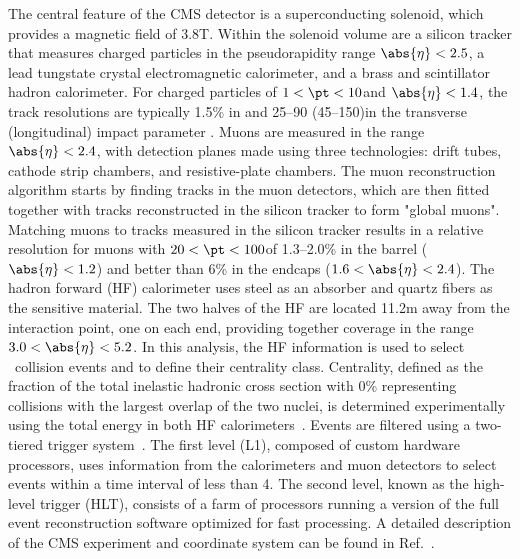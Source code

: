 The central feature of the CMS detector is a superconducting solenoid, which provides a magnetic field of 3.8\unit{T}. Within the solenoid volume are a silicon tracker that measures charged particles in the pseudorapidity range $\abs{\eta} < 2.5$, a lead tungstate crystal electromagnetic calorimeter, and a brass and scintillator hadron calorimeter. For charged particles of $1 < \pt < 10$\GeVc and $\abs{\eta} < 1.4$, the track resolutions are typically 1.5\% in \pt and 25--90 (45--150)\mum in the transverse (longitudinal) impact parameter \cite{TRK-11-001}. Muons are measured in the range $\abs{\eta} < 2.4$, with detection planes made using three technologies: drift tubes, cathode strip chambers, and resistive-plate chambers. The muon reconstruction algorithm starts by finding tracks in the muon detectors, which are then fitted together with tracks reconstructed in the silicon tracker to form "global muons". Matching muons to tracks measured in the silicon tracker results in a relative \pt resolution for muons with $20 < \pt < 100$\GeVc of 1.3--2.0\% in the barrel ($\abs{\eta} < 1.2$) and better than 6\% in the endcaps ($1.6 < \abs{\eta} < 2.4$).
The hadron forward (HF) calorimeter uses steel as an absorber and quartz fibers as the sensitive material. The two halves of the HF are located 11.2\unit{m} away from the interaction point, one on each end, providing together coverage in the range $3.0 < \abs{\eta} < 5.2$. In this analysis, the HF information is used to select \PbPb\ collision events and to define their centrality class. Centrality, defined as the fraction of the total inelastic hadronic cross section with 0\% representing collisions with the largest overlap of the two nuclei, is determined experimentally using the total energy in both HF calorimeters~\cite{centralityref}. 
%
Events are filtered using a two-tiered trigger system~\cite{Khachatryan:2016bia}. 
The first level (L1), composed of custom hardware processors, uses information from the calorimeters and muon detectors to select events within a time interval of less than 4\mus. The second level, known as the high-level trigger (HLT), consists of a farm of processors running a version of the full event reconstruction software optimized for fast processing.
%
A detailed description of the CMS experiment and coordinate system can be found in Ref.~\cite{bib_CMS}.

